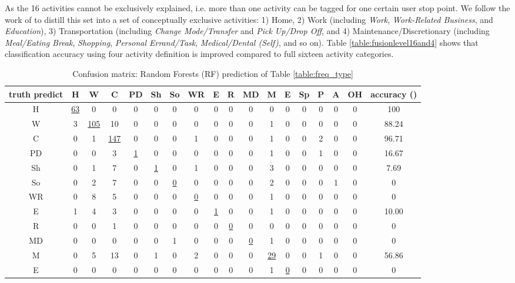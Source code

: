 \documentclass{sig-alternate}
\begin{document}
As the 16 activities cannot be exclusively explained, i.e. more than one activity can be tagged for one certain user stop point. We follow the work of  \cite{Kulkarni2000Microsimulation, Recker1985Travel} to distill this set into a set of conceptually exclusive activities: 1) Home, 2) Work (including \textit{Work}, \textit{Work-Related Business}, and \textit{Education}), 3) Transportation (including \textit{Change Mode/Transfer} and \textit{Pick Up/Drop Off}, and 4) Maintenance/Discretionary (including \textit{Meal/Eating Break}, \textit{Shopping}, \textit{Personal Errand/Task},  \textit{Medical/Dental (Self)}, and so on). Table \ref{table:fusionlevel16and4} shows that classification accuracy using four activity definition is improved compared to full sixteen activity categories.

\begin{table*}[ htb]
\tiny
\caption{Confusion matrix: Random Forests (RF) prediction of Table \ref{table:freq_type} }\label{table:confusion}
\centering
 \begin{tabular}{c| c c c c c c c c c c c c c c c c c }
\toprule
truth predict  & H   & W  & C & PD & Sh &So & WR & E & R & MD & M & E & Sp & P & A & OH   &accuracy ()  \\
\hline
 H   &\underline{63}	&0	&0&	0&	0&	0&	0&	0&	0&	0&	0	&0	&0	&0	&0	&0	&100\\
W	&3	&\underline{105}&10&	0&	0&	0&	0&	0&	0&	0	&1	&0	&0	&0	&0	&0	&88.24\\
C	&0	&1	&\underline{147}&	0&	0&	0&	1&	0&	0&	0&	1	&0	&0	&2	&0	&0	& 96.71\\
PD	&0	&0	&3&	\underline{1}&	0&	0&	0&	0&	0&	0&	1	&0	&0	&1	&0	&0	& 16.67\\
Sh	&0	&1	&7&	0&	\underline{1}&	0&	1&	0&	0&	0&	3	&0	&0	&0	&0	&0	& 7.69\\
So	&0	&2	&7&	0&	0&	\underline{0}&	0&	0&	0&	0&	2	&0	&0	&0	&1	&0	&0\\
WR	&0	&8	&5&	0&	0&	0&	\underline{0}&	0&	0&	0&	1	&0	&0	&0	&0	&0	&0\\
E	&1	&4	&3&	0&	0&	0&	0&	\underline{1}&	0&	0&	1	&0	&0	&0	&0	&0	& 10.00\\
R	&0	&0	&1&	0&	0&	0&	0&	0&	\underline{0}&	0&	0	&0	&0	&0	&0	&0	&0\\
MD	&0	&0	&0&	0&	0&	1&	0&	0&	0&	\underline{0}&	1	&0	&0	&0	&0	&0	&0\\
M	&0	&5	&13	&0	&1	&0	&2	&0	&0	&0	&\underline{29}	&0	&0	&1	&0	&0	& 56.86\\
E	&0	&0	&0&	0&	0&	0&	0&	0&	0&	0&	1	&\underline{0}	&0	&0	&0	&0	&0\\

\end{tabular}
\end{table*}
\end{document}
